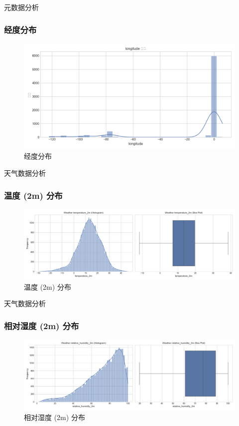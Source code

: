 \documentclass{beamer} %
\begin{document}
\begin{frame}{元数据分析}
    \frametitle{经度分布}
    \begin{figure}
        \centering
        \includegraphics[width=\textwidth]{../plots/metadata_hist_longitude.png}
        \caption{经度分布}
    \end{figure}
\end{frame}

\begin{frame}{天气数据分析}
    \frametitle{温度 (2m) 分布}
    \begin{figure}
        \centering
        \includegraphics[width=\textwidth]{../plots/weather_distribution_temperature_2m.png}
        \caption{温度 (2m) 分布}
    \end{figure}
\end{frame}

\begin{frame}{天气数据分析}
    \frametitle{相对湿度 (2m) 分布}
    \begin{figure}
        \centering
        \includegraphics[width=\textwidth]{../plots/weather_distribution_relative_humidity_2m.png}
        \caption{相对湿度 (2m) 分布}
    \end{figure}
\end{frame}
\end{document}
